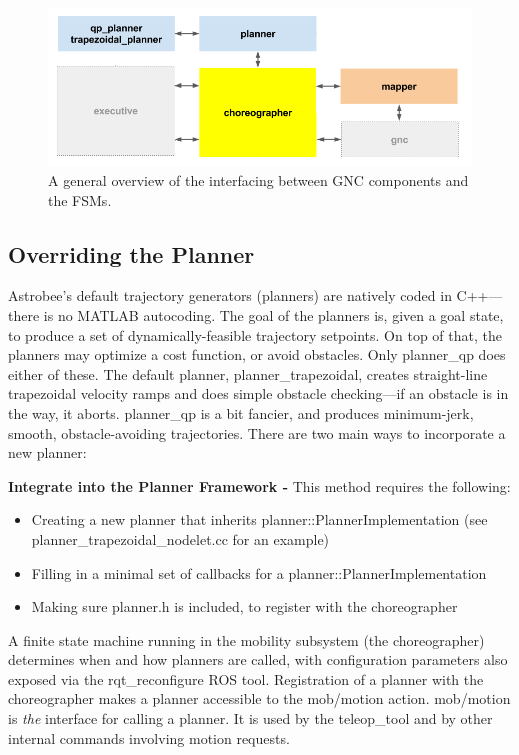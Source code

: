 \documentclass{article}
\begin{document}
\begin{figure}[h!]
	\centering
	\includegraphics[width=1.0\textwidth]{img/mob_overview.png}
	\caption{A general overview of the interfacing between GNC components and the FSMs.}
\end{figure}

\subsection{Overriding the Planner}
\label{sec:plan}
Astrobee's default trajectory generators (planners) are natively coded in C++---there is no MATLAB autocoding. The goal of the planners is, given a goal state, to produce a set of dynamically-feasible trajectory setpoints. On top of that, the planners may optimize a cost function, or avoid obstacles. Only planner\_qp does either of these. The default planner, planner\_trapezoidal, creates straight-line trapezoidal velocity ramps and does simple obstacle checking---if an obstacle is in the way, it aborts. planner\_qp is a bit fancier, and produces minimum-jerk, smooth, obstacle-avoiding trajectories. There are two main ways to incorporate a new planner:

\noindent\textbf{Integrate into the Planner Framework - } This method requires the following:
\begin{itemize}
	\item Creating a new planner that inherits planner::PlannerImplementation (see planner\_trapezoidal\_nodelet.cc for an example)
	\item Filling in a minimal set of callbacks for a planner::PlannerImplementation
	\item Making sure planner.h is included, to register with the choreographer
\end{itemize}

A finite state machine running in the mobility subsystem (the choreographer) determines when and how planners are called, with configuration parameters also exposed via the rqt\_reconfigure ROS tool. Registration of a planner with the choreographer makes a planner accessible to the mob/motion action. mob/motion is \textit{the} interface for calling a planner. It is used by the teleop\_tool and by other internal commands involving motion requests.
\end{document}
